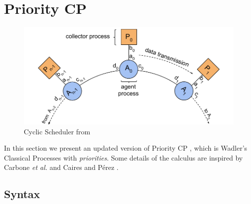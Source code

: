 \documentclass[main.tex]{subfiles}
\begin{document}
\section{Priority CP}

\begin{figure}[t]
  \centering
  \includegraphics[width=0.8\columnwidth]{scheduler}
  \vspace{-4mm}
  \caption{Cyclic Scheduler from \cite{DardhaG18}}
  \label{fig:scheduler}
  \vspace{-4mm}
  \end{figure}

In this section we present an updated version of Priority CP \cite{DardhaG18}, which is Wadler's Classical Processes \cite{W12} with \emph{priorities}.
Some details of the calculus are inspired by Carbone \emph{et al.} \cite{CLMSW16} and Caires and P\'{e}rez \cite{CP17}.

\subsection{Syntax}
\end{document}
